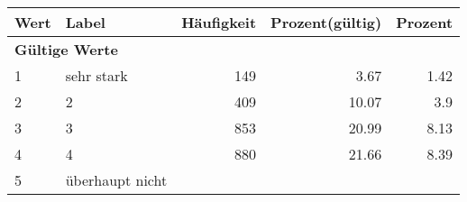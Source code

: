      \begin{longtable}{lXrrr}
     \toprule
     \textbf{Wert} & \textbf{Label} & \textbf{Häufigkeit} & \textbf{Prozent(gültig)} & \textbf{Prozent} \\
     \endhead
     \midrule
     \multicolumn{5}{l}{\textbf{Gültige Werte}}\\

     1 &
     \multicolumn{1}{X}{ sehr stark   } &


       \num{149} &
       \num[round-mode=places,round-precision=2]{3.67} &
         \num[round-mode=places,round-precision=2]{1.42} \\

     2 &
     \multicolumn{1}{X}{ 2   } &


       \num{409} &
       \num[round-mode=places,round-precision=2]{10.07} &
         \num[round-mode=places,round-precision=2]{3.9} \\

     3 &
     \multicolumn{1}{X}{ 3   } &


       \num{853} &
       \num[round-mode=places,round-precision=2]{20.99} &
         \num[round-mode=places,round-precision=2]{8.13} \\

     4 &
     \multicolumn{1}{X}{ 4   } &


       \num{880} &
       \num[round-mode=places,round-precision=2]{21.66} &
         \num[round-mode=places,round-precision=2]{8.39} \\

     5 &
     \multicolumn{1}{X}{ überhaupt nicht   } &



\end{longtable}

